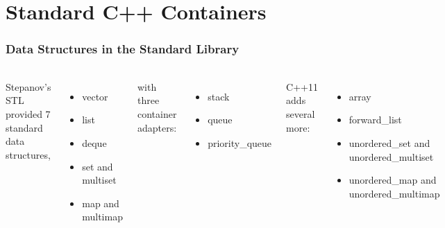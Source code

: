 \section{Standard C++ Containers}

\begin{frame}[fragile]
\frametitle{Data Structures in the Standard Library}
\framesubtitle{}
\begin{columns}[t]
Stepanov's STL provided 7 standard data structures,
\begin{itemize}
\item vector
\item list
\item deque
\item set and multiset
\item map and multimap
\end{itemize}
with three container adapters:
\begin{itemize}
\item stack
\item queue
\item priority\_queue
\end{itemize}


C++11 adds several more:
\begin{itemize}
\item array
\item forward\_list
\item unordered\_set and unordered\_multiset
\item unordered\_map and unordered\_multimap
\end{itemize}
\end{columns}

\end{frame}
